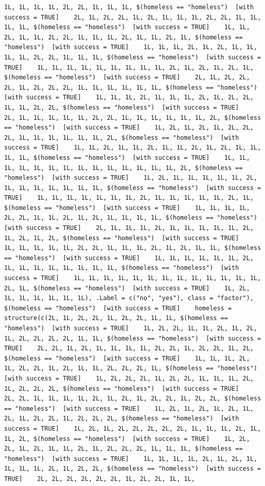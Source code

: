 \documentclass{tufte-book}\usepackage[]{graphicx}\usepackage[]{xcolor}
\makeatletter
\newenvironment{kframe}{%
 \def\at@end@of@kframe{}%
 \ifinner\ifhmode%
  \def\at@end@of@kframe{\end{minipage}}%
  \begin{minipage}{\columnwidth}%
 \fi\fi%
 \def\FrameCommand##1{\hskip\@totalleftmargin \hskip-\fboxsep
 \colorbox{shadecolor}{##1}\hskip-\fboxsep
     \hskip-\linewidth \hskip-\@totalleftmargin \hskip\columnwidth}%
 \MakeFramed {\advance\hsize-\width
   \@totalleftmargin\z@ \linewidth\hsize
   \@setminipage}}%
 {\par\unskip\endMakeFramed%
 \at@end@of@kframe}
\newenvironment{knitrout}{}{} %
\makeatother
\begin{document}
\begin{knitrout}
\begin{kframe}
\begin{verbatim}
1L, 1L, 1L, 1L, 2L, 2L, 1L, 1L, 1L, $(homeless == "homeless")  [with success = TRUE]    2L, 1L, 2L, 2L, 1L, 2L, 1L, 1L, 1L, 2L, 2L, 1L, 1L, 1L, 1L, $(homeless == "homeless")  [with success = TRUE]    1L, 1L, 2L, 1L, 1L, 2L, 2L, 1L, 1L, 1L, 2L, 1L, 1L, 2L, 1L, $(homeless == "homeless")  [with success = TRUE]    1L, 1L, 1L, 2L, 1L, 2L, 1L, 1L, 1L, 1L, 2L, 2L, 1L, 1L, 1L, $(homeless == "homeless")  [with success = TRUE]    1L, 1L, 1L, 1L, 1L, 1L, 1L, 1L, 1L, 2L, 1L, 2L, 1L, 2L, 1L, $(homeless == "homeless")  [with success = TRUE]    2L, 1L, 2L, 2L, 2L, 1L, 2L, 2L, 2L, 1L, 1L, 1L, 1L, 1L, 1L, $(homeless == "homeless")  [with success = TRUE]    1L, 1L, 1L, 2L, 1L, 1L, 1L, 2L, 1L, 2L, 2L, 1L, 1L, 2L, 2L, $(homeless == "homeless")  [with success = TRUE]    2L, 1L, 1L, 1L, 1L, 1L, 2L, 2L, 1L, 1L, 1L, 1L, 1L, 1L, 2L, $(homeless == "homeless")  [with success = TRUE]    1L, 2L, 1L, 2L, 1L, 2L, 2L, 2L, 1L, 1L, 1L, 1L, 1L, 1L, 2L, $(homeless == "homeless")  [with success = TRUE]    1L, 1L, 2L, 1L, 1L, 2L, 1L, 1L, 2L, 1L, 2L, 1L, 1L, 1L, 1L, $(homeless == "homeless")  [with success = TRUE]    1L, 1L, 1L, 1L, 1L, 1L, 1L, 1L, 1L, 1L, 1L, 1L, 1L, 1L, 2L, $(homeless == "homeless")  [with success = TRUE]    1L, 2L, 1L, 1L, 1L, 1L, 1L, 2L, 1L, 1L, 1L, 1L, 1L, 1L, 1L, $(homeless == "homeless")  [with success = TRUE]    1L, 1L, 1L, 1L, 1L, 1L, 1L, 2L, 1L, 1L, 1L, 1L, 1L, 2L, 1L, $(homeless == "homeless")  [with success = TRUE]    1L, 1L, 1L, 1L, 2L, 2L, 1L, 1L, 2L, 1L, 2L, 1L, 1L, 1L, 1L, $(homeless == "homeless")  [with success = TRUE]    2L, 1L, 1L, 1L, 2L, 1L, 1L, 1L, 1L, 1L, 2L, 1L, 2L, 1L, 2L, $(homeless == "homeless")  [with success = TRUE]    1L, 1L, 1L, 1L, 1L, 2L, 2L, 1L, 1L, 1L, 2L, 1L, 2L, 1L, 1L, $(homeless == "homeless")  [with success = TRUE]    1L, 1L, 1L, 1L, 1L, 1L, 2L, 1L, 1L, 1L, 1L, 1L, 1L, 1L, 1L, $(homeless == "homeless")  [with success = TRUE]    1L, 1L, 1L, 1L, 1L, 1L, 1L, 1L, 1L, 1L, 1L, 1L, 1L, 2L, 1L, $(homeless == "homeless")  [with success = TRUE]    1L, 2L, 1L, 1L, 1L, 1L, 1L, 1L), .Label = c("no", "yes"), class = "factor"), $(homeless == "homeless")  [with success = TRUE]    homeless = structure(c(2L, 1L, 2L, 2L, 1L, 2L, 2L, 1L, 1L, $(homeless == "homeless")  [with success = TRUE]    1L, 2L, 2L, 1L, 1L, 2L, 1L, 2L, 1L, 2L, 2L, 2L, 2L, 1L, 1L, $(homeless == "homeless")  [with success = TRUE]    2L, 2L, 1L, 2L, 1L, 1L, 1L, 1L, 2L, 2L, 1L, 2L, 2L, 1L, 2L, $(homeless == "homeless")  [with success = TRUE]    1L, 1L, 1L, 2L, 1L, 2L, 2L, 1L, 2L, 1L, 1L, 2L, 2L, 2L, 1L, $(homeless == "homeless")  [with success = TRUE]    1L, 2L, 2L, 2L, 1L, 2L, 2L, 1L, 1L, 1L, 2L, 1L, 2L, 2L, 2L, $(homeless == "homeless")  [with success = TRUE]    2L, 2L, 1L, 1L, 1L, 1L, 2L, 1L, 2L, 1L, 2L, 2L, 1L, 2L, 2L, $(homeless == "homeless")  [with success = TRUE]    1L, 2L, 1L, 2L, 1L, 2L, 1L, 2L, 1L, 2L, 2L, 1L, 2L, 2L, 2L, $(homeless == "homeless")  [with success = TRUE]    1L, 2L, 1L, 2L, 2L, 2L, 2L, 2L, 1L, 1L, 1L, 2L, 1L, 1L, 2L, $(homeless == "homeless")  [with success = TRUE]    1L, 2L, 2L, 1L, 2L, 1L, 1L, 2L, 1L, 2L, 2L, 2L, 1L, 1L, 1L, $(homeless == "homeless")  [with success = TRUE]    1L, 1L, 1L, 1L, 2L, 1L, 2L, 1L, 1L, 1L, 1L, 2L, 1L, 2L, 2L, $(homeless == "homeless")  [with success = TRUE]    2L, 2L, 2L, 2L, 2L, 2L, 1L, 2L, 2L, 1L, 1L, 
\end{verbatim}
\end{kframe}
\end{knitrout}
\end{document}
